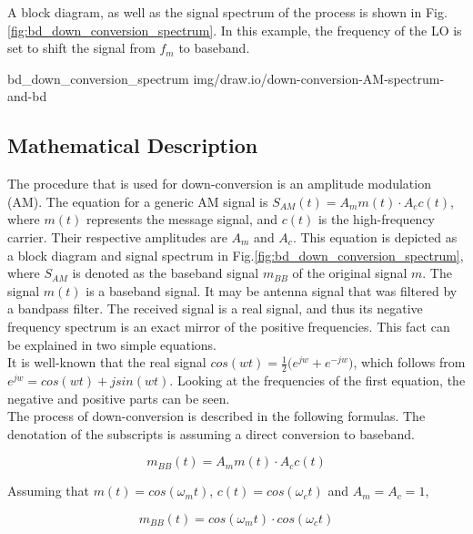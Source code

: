 A block diagram, as well as the signal spectrum of the process is shown in Fig.\ref{fig:bd_down_conversion_spectrum}. In this example, the frequency of the LO is set to shift the signal from $f_m$ to baseband.

 {bd_down_conversion_spectrum} {img/draw.io/down-conversion-AM-spectrum-and-bd}

\subsection{Mathematical Description}

The procedure that is used for down-conversion is an amplitude modulation (AM).
The equation for a generic AM signal is $ S_{AM}(t) = A_m m(t) \cdot A_c c(t) $, where $m(t)$ represents the message signal, and $c(t)$ is the high-frequency carrier.
Their respective amplitudes are $A_m$ and $A_c$.
This equation is depicted as a block diagram and signal spectrum in Fig.\ref{fig:bd_down_conversion_spectrum}, where $S_{AM}$ is denoted as the baseband signal $m_{BB}$ of the original signal $m$.
The signal $m(t)$ is a baseband signal.
It may be antenna signal that was filtered by a bandpass filter.
The received signal is a real signal, and thus its negative frequency spectrum is an exact mirror of the positive frequencies.
This fact can be explained in two simple equations.\\

It is well-known that the real signal $cos(wt) = \frac{1}{2} \Big( e^{jw} + e^{-jw} \Big)$, which follows from $e^{jw} = cos(wt)+jsin(wt)$.
Looking at the frequencies of the first equation, the negative and positive parts can be seen.\\

The process of down-conversion is described in the following formulas.
The denotation of the subscripts is assuming a direct conversion to baseband.

\begin{equation}
  m_{BB}(t) = A_m m(t) \cdot A_c c(t)
\end{equation}

Assuming that $m(t) = cos(\omega_mt)$, $c(t) = cos(\omega_ct)$ and $A_m = A_c = 1$,

\begin{equation}
  m_{BB}(t) = cos(\omega_mt) \cdot cos(\omega_ct)
\end{equation}

